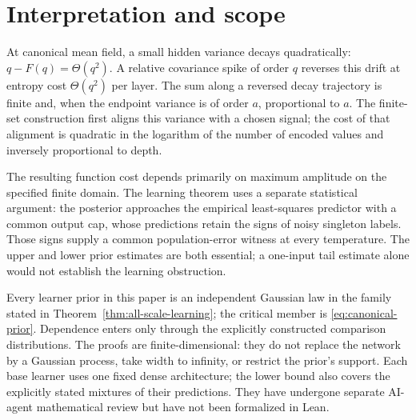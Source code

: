 \documentclass[11pt]{article}
\begin{document}























\section{Interpretation and scope}
At canonical mean field, a small hidden variance decays quadratically: $q-F(q)=\Theta(q^2)$. A relative covariance spike of order $q$ reverses this drift at entropy cost $\Theta(q^2)$ per layer. The sum along a reversed decay trajectory is finite and, when the endpoint variance is of order $a$, proportional to $a$. The finite-set construction first aligns this variance with a chosen signal; the cost of that alignment is quadratic in the logarithm of the number of encoded values and inversely proportional to depth.

The resulting function cost depends primarily on maximum amplitude on the specified finite domain. The learning theorem uses a separate statistical argument: the posterior approaches the empirical least-squares predictor with a common output cap, whose predictions retain the signs of noisy singleton labels. Those signs supply a common population-error witness at every temperature. The upper and lower prior estimates are both essential; a one-input tail estimate alone would not establish the learning obstruction.

Every learner prior in this paper is an independent Gaussian law in the family stated in Theorem~\ref{thm:all-scale-learning}; the critical member is \eqref{eq:canonical-prior}. Dependence enters only through the explicitly constructed comparison distributions. The proofs are finite-dimensional: they do not replace the network by a Gaussian process, take width to infinity, or restrict the prior's support. Each base learner uses one fixed dense architecture; the lower bound also covers the explicitly stated mixtures of their predictions. They have undergone separate AI-agent mathematical review but have not been formalized in Lean.
\appendix

\end{document}
